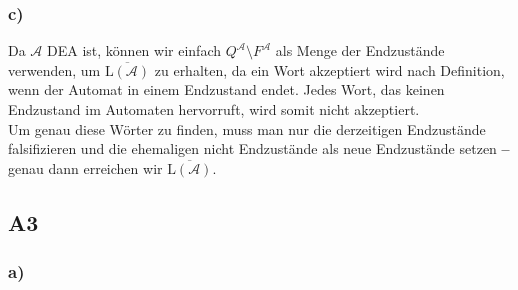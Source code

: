 \documentclass[12pt, a4paper]{article}
\newcommand*{\gedanke}{\textbf{-- }}
\begin{document}
\begin{doublespace}
\subsubsection*{c)}
Da \(\mathcal{A}\) DEA ist, können wir einfach \(Q^\mathcal{A} \setminus F^\mathcal{A}\) als Menge der Endzustände verwenden, um \(\overline{\text{L}(\mathcal A)}\) zu erhalten, da ein Wort akzeptiert wird nach Definition, wenn der Automat in einem Endzustand endet. Jedes Wort, das keinen Endzustand im Automaten hervorruft, wird somit nicht akzeptiert. \\
Um genau diese Wörter zu finden, muss man nur die derzeitigen Endzustände falsifizieren und die ehemaligen nicht Endzustände als neue Endzustände setzen \gedanke genau dann erreichen wir \(\overline{\text{L}(\mathcal A)}\).
\subsection*{A3}
\subsubsection*{a)}
\end{doublespace}
\vspace*{-1cm}
\end{document}
